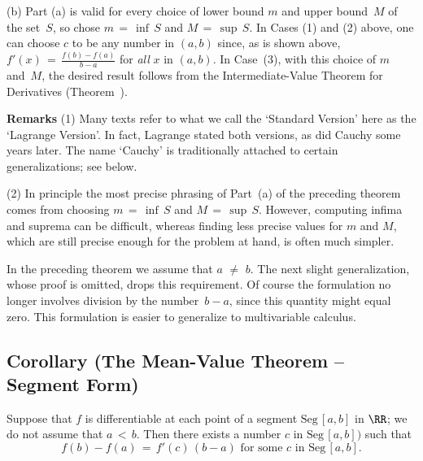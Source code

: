 \V

        (b) Part (a) is valid for every choice of lower bound $m$ and upper bound~$M$ of the set~$S$, so chose $m \,=\, {\inf}\,S$ and $M \,=\, {\sup}\,S$.
    In Cases (1) and (2) above, one can choose $c$ to be any number in $(a,b)$ since,
    as is shown above, $f'(x) \,=\, {\displaystyle \frac{f(b)-f(a)}{b-a}}$ for {\em all} $x$ in $(a,b)$.
        In Case~(3), with this choice of $m$ and~$M$, the desired result follows from the Intermediate-Value Theorem for Derivatives (Theorem~). 
    \Q

\VV

        {\bf Remarks} (1) Many texts refer to what we call the `Standard Version' here as the `Lagrange Version'.
    In fact, Lagrange stated both versions, as did Cauchy some years later. The name `Cauchy' is traditionally attached to certain generalizations; see below.

\V

        (2) In principle the most precise phrasing of Part~(a) of the preceding theorem comes from choosing $m \,=\, {\inf}\,S$ and $M \,=\, {\sup}\,S$.
    However, computing infima and suprema can be difficult, whereas finding less precise values for $m$ and $M$,
    which are still precise enough for the problem at hand, is often much simpler.
    

\VV

        In the preceding theorem we assume that $a \,\,{\neq}\,\, b$. The next slight generalization, whose proof is omitted, drops this requirement.
    Of course the formulation no longer involves division by the number~$b-a$, since this quantity might equal zero.
    This formulation is easier to generalize to multivariable calculus.

\V


             \subsection{\small{\bf Corollary} (The Mean-Value Theorem -- Segment Form)}
            \label{CorE50.25}

\V

    Suppose that $f$ is differentiable at each point of a segment $\mbox{Seg}\,[a,b]$ in ${\RR}$; we do not assume that $a\,<\,b$.
    Then there exists a number $c$ in $\mbox{Seg}\,[a,b])$ such that
        \begin{equation}
        \label{EqnE.100D}
        f(b) - f(a) \,=\, f'(c)\,(b-a) \mbox{ for some $c$ in $\mbox{Seg}\,[a,b]$}.
        \end{equation}
 

